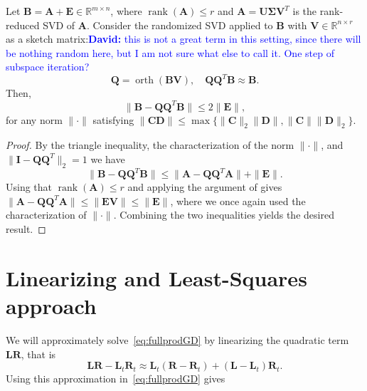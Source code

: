 \documentclass[11pt]{article}
\newcommand{\mat}[1]{\bm{#1}}
\newcommand{\R}{\mathbb{R}}
\newcommand{\mL}{\mat{L}}
\newcommand{\mR}{\mat{R}}
\newcommand{\mV}{\mat{V}}
\newcommand{\mU}{\mat{U}}
\newcommand{\DW}{\mat{\Delta W}}
\DeclareMathOperator{\rank}{rank}
\DeclareMathOperator{\orth}{orth}
\newcommand{\David}[1]{\textcolor{blue}{\textbf{David:} #1}}
\begin{document}
\begin{theorem}
    Let $\bm{B} = \bm{A} + \bm{E} \in \mathbb{R}^{m \times n}$, where $\rank(\bm{A}) \leq r$ and $\bm{A} = \bm{U} \bm{\Sigma} \bm{V}^T$ is the rank-reduced SVD of $\bm{A}$. Consider the randomized SVD applied to $\bm{B}$ with $\bm{V} \in \mathbb{R}^{n \times r}$ as a sketch matrix:\David{this is not a great term in this setting, since there will be nothing random here, but I am not sure what else to call it. One step of subspace iteration?}
    \begin{equation*}
        \bm{Q} = \orth(\bm{B} \bm{V}), \quad \bm{Q}\bm{Q}^T \bm{B} \approx \bm{B}.
    \end{equation*}
    Then,
    \begin{equation*}
        \|\bm{B} - \bm{Q} \bm{Q}^T \bm{B}\| \leq 2\|\bm{E}\|,
    \end{equation*}
    for any norm $\|\cdot\|$ satisfying $\|\bm{C} \bm{D}\| \leq \max\{\|\bm{C}\|_2 \|\bm{D}\|, \|\bm{C}\| \|\bm{D}\|_2\}$. 
\end{theorem}
\begin{proof}
    By the triangle inequality, the characterization of the norm $\|\cdot\|$, and $\|\bm{I} - \bm{Q} \bm{Q}^T\|_2 = 1$ we have
    \begin{equation*}
        \|\bm{B} - \bm{Q} \bm{Q}^T \bm{B}\| \leq \|\bm{A} - \bm{Q} \bm{Q}^T \bm{A}\| +  \|\bm{E}\|.
    \end{equation*}
    Using that $\rank(\bm{A}) \leq r$ and applying the argument of \cite[Theorem 3.1]{hodlr} gives $\|\bm{A} - \bm{Q} \bm{Q}^T \bm{A}\| \leq \|\bm{E}\bm{V}\| \leq \|\bm{E}\|$, where we once again used the characterization of $\|\cdot\|$. Combining the two inequalities yields the desired result. 
\end{proof}

\section{Linearizing and Least-Squares approach}
We will approximately solve~\eqref{eq:fullprodGD} by linearizing the quadratic term $\mL\mR$, that is
\begin{equation}
 \mL\mR-\mL_t\mR_t  \approx   \mL_t(\mR-\mR_t)+(\mL-\mL_t)\mR_t.
\end{equation}
Using this approximation in~\eqref{eq:fullprodGD} gives 
\end{document}
